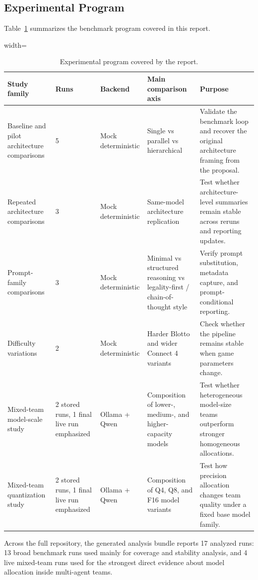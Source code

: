 \documentclass[11pt]{article}
\begin{document}
\subsection{Experimental Program}
Table~\ref{tab:program} summarizes the benchmark program covered in this report.

\begin{table}[H]
\centering
\caption{Experimental program covered by the report.}
\label{tab:program}
\begin{adjustbox}{width=\textwidth}
\begin{tabular}{@{}p{3.0cm}p{2.0cm}p{2.1cm}p{3.0cm}p{4.4cm}@{}}
\toprule
Study family & Runs & Backend & Main comparison axis & Purpose \\
\midrule
Baseline and pilot architecture comparisons & 5 & Mock deterministic & Single vs parallel vs hierarchical & Validate the benchmark loop and recover the original architecture framing from the proposal. \\
Repeated architecture comparisons & 3 & Mock deterministic & Same-model architecture replication & Test whether architecture-level summaries remain stable across reruns and reporting updates. \\
Prompt-family comparisons & 3 & Mock deterministic & Minimal vs structured reasoning vs legality-first / chain-of-thought style & Verify prompt substitution, metadata capture, and prompt-conditional reporting. \\
Difficulty variations & 2 & Mock deterministic & Harder Blotto and wider Connect 4 variants & Check whether the pipeline remains stable when game parameters change. \\
Mixed-team model-scale study & 2 stored runs, 1 final live run emphasized & Ollama + Qwen & Composition of lower-, medium-, and higher-capacity models & Test whether heterogeneous model-size teams outperform stronger homogeneous allocations. \\
Mixed-team quantization study & 2 stored runs, 1 final live run emphasized & Ollama + Qwen & Composition of Q4, Q8, and F16 model variants & Test how precision allocation changes team quality under a fixed base model family. \\
\bottomrule
\end{tabular}
\end{adjustbox}
\end{table}

Across the full repository, the generated analysis bundle reports 17 analyzed runs: 13 broad benchmark runs used mainly for coverage and stability analysis, and 4 live mixed-team runs used for the strongest direct evidence about model allocation inside multi-agent teams.
\end{document}
